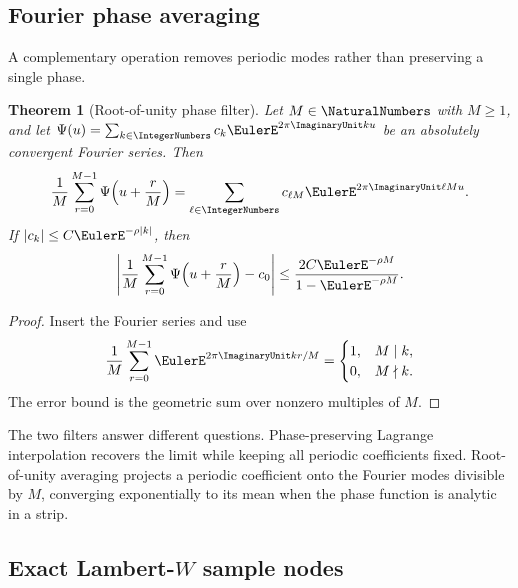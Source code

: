 \documentclass[11pt]{article}
\numberwithin{equation}{section}
\newtheorem{theorem}{Theorem}[section]
\theoremstyle{definition}
\theoremstyle{remark}
\begin{document}
\subsection{Fourier phase averaging}

A complementary operation removes periodic modes rather than preserving a single phase.

\begin{theorem}[Root-of-unity phase filter]
\label{p10:thm:phase-average}
Let $M\in\NaturalNumbers$ with $M\ge1$, and let
\(
 \Psi(u)=\sum_{k\in\IntegerNumbers}c_k\EulerE^{2\pi\ImaginaryUnit ku}
\)
be an absolutely convergent Fourier series.  Then
\begin{equation}
 \frac1M\sum_{r=0}^{M-1}\Psi\!\left(u+\frac rM\right)
 =\sum_{\ell\in\IntegerNumbers}c_{\ell M}\EulerE^{2\pi\ImaginaryUnit\ell Mu}.            \label{p10:eq:phase-average}
\end{equation}
If $|c_k|\le C\EulerE^{-\rho|k|}$, then
\begin{equation}
 \left|
 \frac1M\sum_{r=0}^{M-1}\Psi\!\left(u+\frac rM\right)-c_0
 \right|
 \le\frac{2C\EulerE^{-\rho M}}{1-\EulerE^{-\rho M}}.                 \label{p10:eq:phase-average-error}
\end{equation}
\end{theorem}

\begin{proof}
Insert the Fourier series and use
\[
 \frac1M\sum_{r=0}^{M-1}\EulerE^{2\pi\ImaginaryUnit kr/M}
 =\begin{cases}1,&M\mid k,\\0,&M\nmid k.\end{cases}
\]
The error bound is the geometric sum over nonzero multiples of $M$.
\end{proof}

The two filters answer different questions.  Phase-preserving Lagrange interpolation recovers
the limit while keeping all periodic coefficients fixed.  Root-of-unity averaging projects a
periodic coefficient onto the Fourier modes divisible by $M$, converging exponentially to its
mean when the phase function is analytic in a strip.

\subsection{Exact Lambert-\texorpdfstring{$W$}{W} sample nodes}
\end{document}
